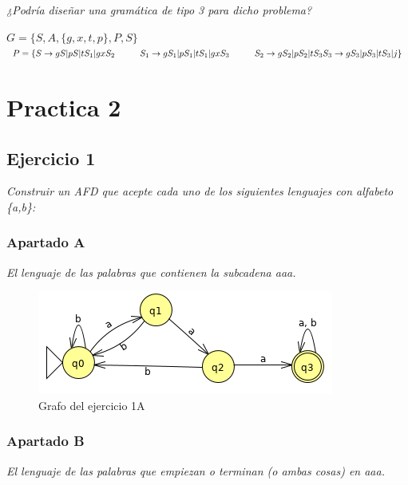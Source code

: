 \textit{¿Podría diseñar una gramática de tipo 3 para dicho problema?} \newline

$ G = \{S,  A, \{ g,x,t,p \} ,P,S\} $ \newline
$ P = \{ S \rightarrow gS|pS|tS_{1}|gxS_{2} \hspace{1cm} S_{1} \rightarrow gS_{1}|pS_{1}|tS_{1}|gxS_{3} \hspace{1cm} S_{2} \rightarrow gS_{2}|pS_{2}|tS_{3} \newline S_{3} \rightarrow gS_{3}|pS_{3}|tS_{3}|j \} $ \newline

\newpage

\section{Practica 2}

\subsection{Ejercicio 1}

\textit{Construir un AFD que acepte cada uno de los siguientes lenguajes con alfabeto \{a,b\}:}

\subsubsection{Apartado A}

\textit{El lenguaje de las palabras que contienen la subcadena aaa.}

\begin{figure}[h]
\centering
\includegraphics[width=0.7\linewidth]{image/ejercicio1}
\caption[prac 2 - ejer 1A]{Grafo del ejercicio 1A}
\label{fig:ejercicio1A}
\end{figure}

\subsubsection{Apartado B}

\textit{El lenguaje de las palabras que empiezan o terminan (o ambas cosas) en aaa.}

